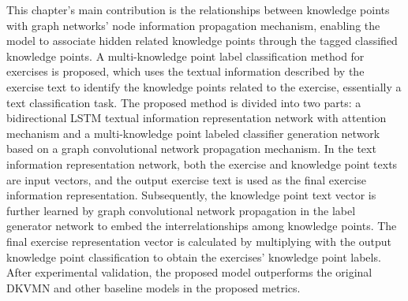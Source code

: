 
This chapter's main contribution is the relationships between knowledge points with graph networks' node information propagation mechanism, enabling the model to associate hidden related knowledge points through the tagged classified knowledge points. A multi-knowledge point label classification method for exercises is proposed, which uses the textual information described by the exercise text to identify the knowledge points related to the exercise, essentially a text classification task. The proposed method is divided into two parts: a bidirectional LSTM textual information representation network with attention mechanism and a multi-knowledge point labeled classifier generation network based on a graph convolutional network propagation mechanism. In the text information representation network, both the exercise and knowledge point texts are input vectors, and the output exercise text is used as the final exercise information representation. Subsequently, the knowledge point text vector is further learned by graph convolutional network propagation in the label generator network to embed the interrelationships among knowledge points. The final exercise representation vector is calculated by multiplying with the output knowledge point classification to obtain the exercises' knowledge point labels. After experimental validation, the proposed model outperforms the original DKVMN and other baseline models in the proposed metrics.




